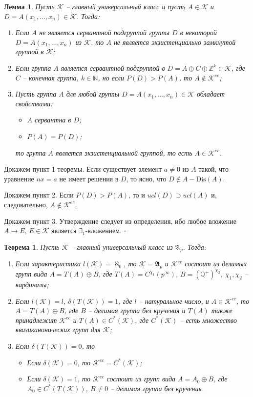 \documentclass[12pt]{extarticle} %
\newtheorem{theorem}{Теорема}[section]
\newtheorem{lemma}{Лемма}[section]
\def\proof{{\noindent{\bf Доказательство.}} }
\def\A{{\mathfrak{A}}}
\def\K{{\mathcal{K}}}
\def\Kec{\mathcal{K}^{ec}}
\def\Z{{\mathbb{Z}}}
\def\N{{\mathbb{N}}}
\def\Q{{\mathbb{Q}}}
\def\Dis{{\mathrm{Dis}}}
\begin{document}
\begin{lemma}\label{lemma:AinOrnotinKec}
Пусть $\K$ -- главный универсальный класс и пусть $A \in \K$ и $D = A(x_1, \ldots, x_n) \in \K$. Тогда:
\begin{enumerate}
\item Если $A$ не является сервантной подгруппой группы $D$ в некоторой $D = A(x_1, \ldots, x_n)$ из $\K$, то $A$ не является экзистенциально замкнутой группой в $\K$;

\item Если группа $A$ является сервантной подгруппой в $D = A \oplus C \oplus \Z^k \in \K$, где $C$ -- конечная группа, $k \in \N$, но если $P(D) > P(A)$, то $A \notin \Kec$;

\item Пусть группа $A$ для любой группы $D = A(x_1, \ldots, x_n) \in \K$ обладает свойствами:
\begin{itemize}
\item $A$ сервантна в $D$;
\item $P(A) = P(D)$;
\end{itemize}
то группа $A$ является экзистенциальной группой, то есть $A \in \Kec$.
\end{enumerate}
\end{lemma}

\proof Докажем пункт 1 теоремы. Если существует элемент $a \neq 0$ из $A$ такой, что уравнение $nx = a$ не имеет решения в $D$, то ясно, что $D \notin A-\Dis(A)$.

Докажем пункт 2. Если $P(D) > P(A)$, то и $ucl(D) \supset ucl(A)$ и, следовательно, $A \notin \Kec$.

Докажем пункт 3. Утверждение следует из определения, ибо любое вложение $A \rightarrow E$, $E \in \K$ является $\exists_1$-вложением. $\square$



\begin{theorem}\label{th:GroupsInKecAp}
Пусть $\K$ -- главный универсальный класс из $\A_p$. Тогда:
\begin{enumerate}
\item Если характеристика $l(\K) = \aleph_0$, то $\K = \A_p$ и $\Kec$ состоит из делимых групп вида $A = T(A) \oplus B$, где $T(A) = C^{\chi_1}(p^\infty)$, $B = (\Q^+)^{\chi_2}$, $\chi_1, \chi_2$ -- кардиналы;

\item Если $l(\K) = l$, $\delta(T(\K)) = 1$, где $l$ -- натуральное число, и $A \in \Kec$, то $A = T(A) \oplus B$, где $B$ -- делимая группа без кручения и $T(A)$ также принадлежит $\Kec$ и $T(A) \in C^*(\K)$, где $C^*(\K)$ -- есть множество квазиканонических групп для $\K$;

\item Если $\delta(T(\K)) = 0$, то 
\begin{itemize}
\item Если $\delta(\K) = 0$, то $\Kec = C^*(\K)$;
\item Если $\delta(\K) = 1$, то $\Kec$ состоит из групп вида $A = A_0 \oplus B$, где $A_0 \in C^*(T(\K))$, $B \neq 0$ -- делимая группа без кручения.
\end{itemize}
\end{enumerate}
\end{theorem}
\end{document}
